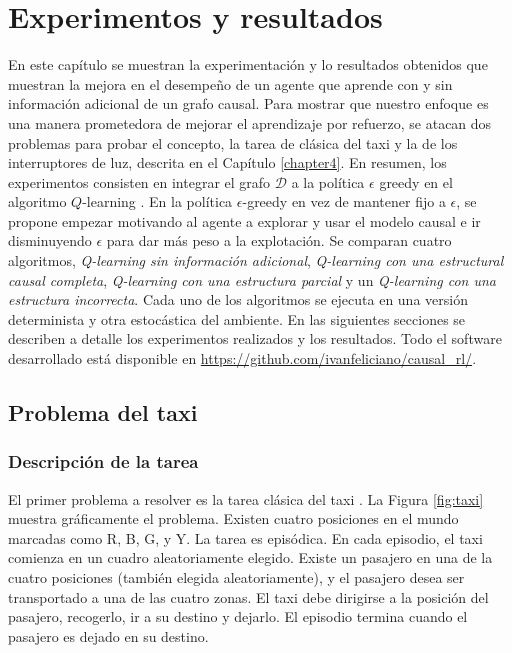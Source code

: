 \chapter{\color{blue}Experimentos y resultados}\label{chapter5}

\graphicspath{{Chapter5/Figs/}}


En este capítulo se muestran la experimentación y lo resultados obtenidos
que muestran la mejora en el desempeño de un agente que aprende
con y sin información adicional de un grafo causal.
Para mostrar que nuestro enfoque es una manera prometedora 
de mejorar el aprendizaje por refuerzo, se atacan dos problemas para
probar el concepto, la tarea de clásica del taxi \cite{Dietterich:2000:HRL:1622262.1622268} y la de los
interruptores de luz, descrita en el Capítulo \ref{chapter4}.
En resumen, los experimentos consisten en integrar el grafo $\mathcal{D}$ a la política $\epsilon$ greedy
en el algoritmo $Q$-learning \cite{watkins1992q}.
En la política $\epsilon$-greedy en vez de mantener fijo a $\epsilon$, se propone empezar motivando al agente a explorar y usar
el modelo causal e ir disminuyendo $\epsilon$ para dar más peso a la explotación.
Se comparan cuatro algoritmos, \textit{Q-learning sin información
adicional}, \textit{Q-learning con una estructural causal completa}, \textit{Q-learning con una estructura parcial} y un \textit{Q-learning con una estructura incorrecta}.
Cada uno de los algoritmos se ejecuta en una versión determinista y 
otra estocástica del ambiente. 
En las siguientes secciones se describen a detalle los experimentos realizados y los resultados. Todo el software desarrollado está 
disponible en \url{https://github.com/ivanfeliciano/causal_rl/}.


\section{Problema del taxi}

\subsection{Descripción de la tarea}

El primer problema a resolver es la tarea clásica del taxi \cite{Dietterich:2000:HRL:1622262.1622268}.
La Figura \ref{fig:taxi} muestra gráficamente el problema.
Existen cuatro posiciones en el mundo marcadas como R, B, G, y Y. 
La tarea es episódica. En cada episodio, 
el taxi comienza en un cuadro aleatoriamente elegido. 
Existe un pasajero en una de la cuatro posiciones (también elegida
aleatoriamente), y el pasajero desea ser transportado a una de las
cuatro zonas.
El taxi debe dirigirse a la posición del pasajero, recogerlo, ir a su destino y dejarlo.
El episodio termina cuando el pasajero es dejado en su destino.

